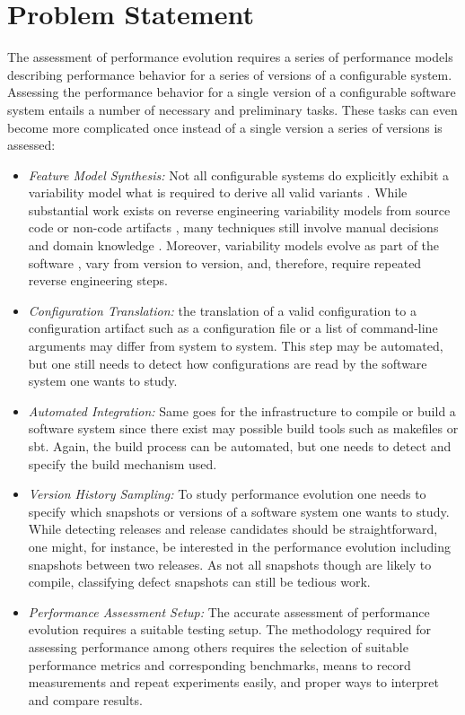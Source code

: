 \section{Problem Statement}
The assessment of performance evolution requires a series of performance models
describing performance behavior for a series of versions of a configurable
system. Assessing the performance behavior for a single version of a
configurable software system entails a number of necessary and preliminary
tasks. These tasks can even become more complicated once instead of a single
version a series of versions is assessed:
\begin{itemize}
  \item \emph{Feature Model Synthesis:} Not all configurable systems do
  explicitly exhibit a variability model what is required to derive all valid variants
	\citep{rabkin_static_2011,nadi_where_2015}.
	While substantial work exists on reverse engineering variability models from
	source
	\citep{rabkin_static_2011,she_reverse_2011,zhou_extracting_2015,nadi_where_2015}
	code or non-code artifacts
	\citep{alves_exploratory_2008,andersen_efficient_2012,bakar_feature_2015}, many
	techniques still involve manual decisions \citep{she_reverse_2011} and domain
	knowledge \citep{nadi_where_2015}.
	Moreover, variability models evolve as part of the software
	\citep{peng_analyzing_2011}, vary from version to version, and, therefore,
	require repeated reverse engineering steps.
	
	\item \emph{Configuration Translation:} the translation of a valid
	configuration to a configuration artifact such as a configuration file or a list of command-line arguments may differ
from system to system. This step may be automated, but one still needs to
detect how configurations are read by the software system one wants to study.

\item \emph{Automated Integration:} Same goes for the infrastructure to
compile or build a software system since there exist may possible build tools such as makefiles or sbt.
Again, the build process can be automated, but one needs to detect and
specify the build mechanism used.

\item \emph{Version History Sampling:} To study performance evolution one
needs to specify which snapshots or versions of a software system one wants to study. While detecting
releases and release candidates should be straightforward, one might, for
instance, be interested in the performance evolution including snapshots
between two releases. As not all snapshots though are likely to compile,
classifying defect snapshots can still be tedious work.
\item \emph{Performance Assessment Setup:} The accurate assessment of
performance evolution requires a suitable testing setup. The methodology required for assessing performance
among others requires the selection of suitable performance metrics and
corresponding benchmarks, means to record measurements and repeat experiments
easily, and proper ways to interpret and compare results.
\end{itemize}
